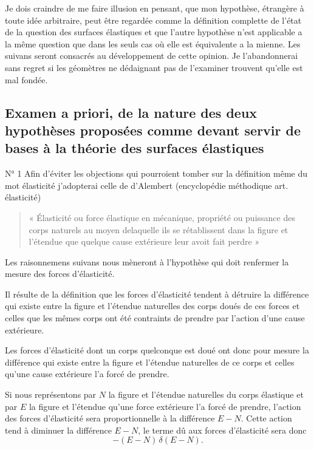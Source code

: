 \documentclass[11pt,a4paper]{article}
\begin{document}
Je dois craindre de me faire illusion en pensant, que mon hypothèse, étrangère
à toute idée arbitraire, peut être regardée comme la définition complette de
l'état de la question des surfaces élastiques et que l'autre hypothèse n'est
applicable a la même question que dans les seuls cas où elle est équivalente a
la mienne. Les  suivans seront consacrés au développement de
cette opinion. Je l'abandonnerai sans regret si les géomètres ne dédaignant
pas de l'examiner trouvent qu'elle est mal fondée.


\subsection{Examen a priori, de la nature des deux hypothèses proposées comme devant servir de bases à la théorie des surfaces élastiques}

N° 1 Afin d'éviter les objections qui pourroient tomber sur la définition même
du mot élasticité j'adopterai celle de d'Alembert (encyclopédie méthodique
art. élasticité)

\begin{quote}
« Élasticité ou force élastique en mécanique, propriété ou puissance des corps
naturels au moyen delaquelle ils se rétablissent dans la figure et l'étendue
que quelque cause extérieure leur avoit fait perdre »
\end{quote}

Les raisonnemens suivans nous mèneront à l'hypothèse qui doit renfermer la
mesure des forces d'élasticité.

Il résulte de la définition que les forces d'élasticité tendent à détruire la
différence qui existe entre la figure et l'étendue naturelles des corps doués
de ces forces et celles que les mêmes corps ont été contraints de prendre par
l'action d'une cause extérieure.

Les forces d'élasticité dont un corps quelconque est doué ont donc pour mesure
la différence qui existe entre la figure et l'étendue naturelles de ce corps
et celles qu'une cause extérieure l'a forcé de prendre.

Si nous représentons par $N$ la figure et l'étendue naturelles du corps
élastique et par $E$ la figure et l'étendue qu'une force extérieure l'a forcé
de prendre, l'action des forces d'élasticité sera proportionnelle à la
différence $E-N$. Cette action tend à diminuer la différence $E-N$, le terme
dû aux forces d'élasticité sera donc
\[
  -(E-N)\,\delta(E-N).
\]
\end{document}
